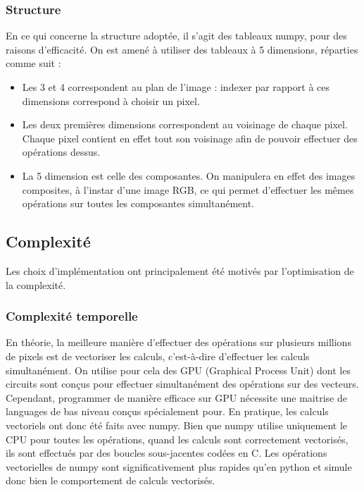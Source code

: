 \documentclass{article}
\begin{document}
\begin{multicols}{2}
\subsubsection{Structure}
En ce qui concerne la structure adoptée, il s'agit des tableaux numpy, pour des raisons d'efficacité. On est amené à utiliser des tableaux à 5 dimensions, réparties comme suit :
\begin{itemize}
	\item Les 3 et 4 correspondent au plan de l'image : indexer par rapport à ces dimensions correspond à choisir un pixel.
	\item Les deux premières dimensions correspondent au voisinage de chaque pixel. Chaque pixel contient en effet tout son voisinage afin de pouvoir effectuer des opérations dessus.
	\item La 5 dimension est celle des composantes. On manipulera en effet des images composites, à l'instar d'une image RGB, ce qui permet d'effectuer les mêmes opérations sur toutes les composantes simultanément.
\end{itemize}

\subsection{Complexité}

Les choix d'implémentation ont principalement été motivés par l'optimisation de la complexité.

\subsubsection{Complexité temporelle} 
En théorie, la meilleure manière d'effectuer des opérations sur plusieurs millions de pixels est de vectoriser les calculs, c'est-à-dire d'effectuer les calculs simultanément. On utilise pour cela des GPU (Graphical Process Unit) dont les circuits sont conçus pour effectuer simultanément des opérations sur des vecteurs. Cependant, programmer de manière efficace sur GPU nécessite une maitrise de languages de bas niveau conçus spécialement pour. En pratique, les calculs vectoriels ont donc été faits avec numpy. Bien que numpy utilise uniquement le CPU pour toutes les opérations, quand les calculs sont correctement vectorisés, ils sont effectués par des boucles sous-jacentes codées en C. Les opérations vectorielles de numpy sont significativement plus rapides qu'en python et simule donc bien le comportement de calculs vectorisés.


\end{multicols}
\end{document}
